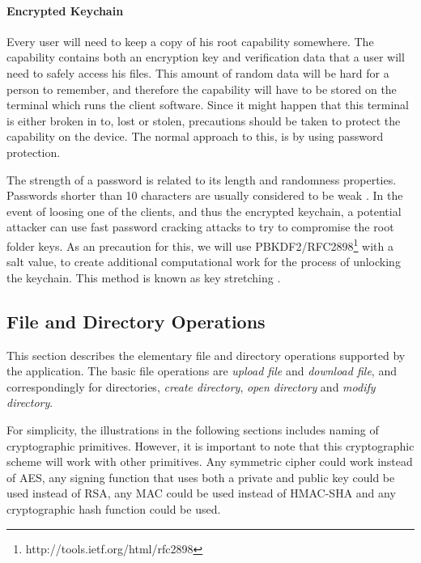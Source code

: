 \documentclass[pdftex,english,10pt,b5paper,twoside]{book}
\begin{document}


\paragraph{Encrypted Keychain} Every user will need to keep a copy of his root
capability somewhere. The capability contains both an encryption key and
verification data that a user will need to safely access his files.
This amount of random data will be hard for a person to remember, and therefore
the capability will have to be stored on the terminal which runs the client
software. Since it might happen that this terminal is either broken in to,
lost or stolen, precautions should be taken to protect the capability on the
device. The normal approach to this, is by using password protection.

The strength of a password is related to its length and randomness properties.
Passwords shorter than 10 characters are usually considered to be weak
\cite{pbkdf_nist}. In the event of loosing one of the clients, and thus the
encrypted keychain, a potential attacker can use fast password cracking attacks
to try to compromise the root folder keys. As an precaution for this, we will
use \ac{PBKDF2}/RFC2898\footnote{http://tools.ietf.org/html/rfc2898} with a
salt value, to create additional computational work for the process of
unlocking the keychain. This method is known as key stretching
\cite{keystretch}. %

\subsection{File and Directory Operations}
\label{sec:CS:DO}

This section describes the elementary file and directory operations supported
by the application. The basic file operations are \emph{upload file} and
\emph{download file}, and correspondingly for directories, \emph{create
directory}, \emph{open directory} and \emph{modify directory}.

For simplicity, the illustrations in the following sections includes naming of
cryptographic primitives. However, it is important to note that this
cryptographic scheme will work with other primitives. Any symmetric cipher
could work instead of \ac{AES}, any signing function that uses both a private
and public key could be used instead of \ac{RSA}, any \ac{MAC} could be used
instead of HMAC-\ac{SHA} and any cryptographic hash function could be used.
\end{document}
